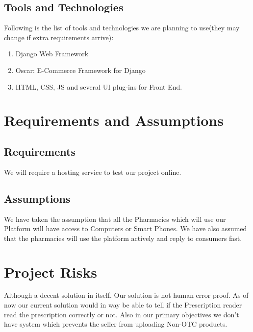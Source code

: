 \documentclass[fleqn,10pt]{../SelfArx} %
\begin{document}
\subsection{Tools and Technologies}
Following is the list of tools and technologies we are planning to use(they may change if extra requirements arrive):
\begin{enumerate}
\item Django Web Framework
\item Oscar: E-Commerce Framework for Django
\item HTML, CSS, JS and several UI plug-ins for Front End.
\end{enumerate}


\section{Requirements and Assumptions}

\subsection{Requirements}
We will require a hosting service to test our project online.
\subsection{Assumptions}
We have taken the assumption that all the Pharmacies which will use our Platform will have access to Computers or Smart Phones.
We have also assumed that the pharmacies will use the platform actively and reply to consumers fast.



\section{Project Risks}
Although a decent solution in itself. Our solution is not human error proof. As of now our current solution would in way be able to tell if the Prescription reader read the prescription correctly or not. Also in our primary objectives we don't have system which prevents the seller from uploading Non-OTC products.
\end{document}

